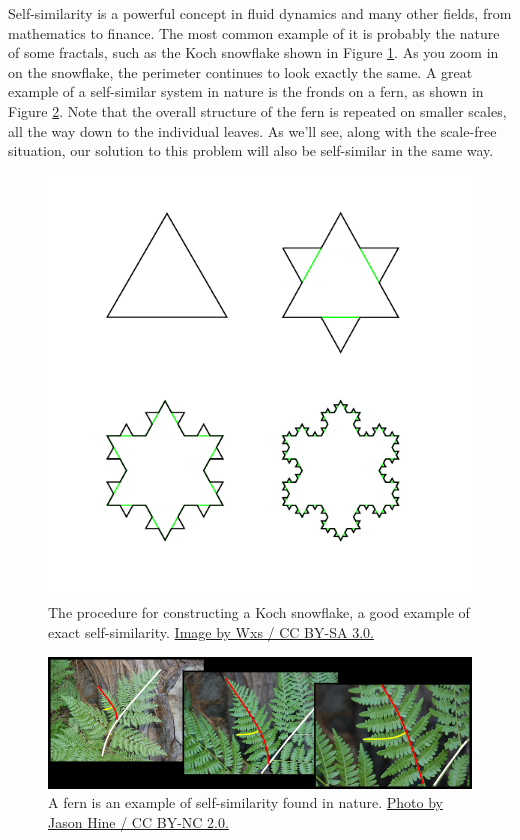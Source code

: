 Self-similarity is a powerful concept in fluid dynamics and many other fields, from mathematics to finance.  The most common example of it is probably the nature of some fractals, such as the Koch snowflake shown in Figure \ref{fig_koch}.  As you zoom in on the snowflake, the perimeter continues to look exactly the same.  A great example of a self-similar system in nature is the fronds on a fern, as shown in Figure \ref{fig_fern}.  Note that the overall structure of the fern is repeated on smaller scales, all the way down to the individual leaves.  As we'll see, along with the scale-free situation, our solution to this problem will also be self-similar in the same way.

\begin{figure}
\centering
\includegraphics[width=0.5\linewidth]{Figures/Chapter2/fig_koch}
\caption{The procedure for constructing a Koch snowflake, a good example of exact self-similarity.  \href{https://commons.wikimedia.org/wiki/File:KochFlake.svg}{Image by Wxs / CC BY-SA 3.0.} }
\label{fig_koch}
\end{figure}

\begin{figure}
\centering
\includegraphics[width=1\linewidth]{Figures/Chapter2/fig_fern.png}
\caption{A fern is an example of self-similarity found in nature.  \href{https://www.flickr.com/photos/78523101@N04/7572281628}{Photo by Jason Hine / CC BY-NC 2.0.} }
\label{fig_fern}
\end{figure}

